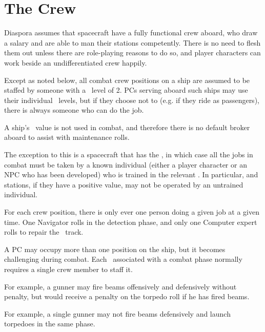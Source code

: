 \section{The Crew}
\label{sec:the-crew}

Diaspora assumes that spacecraft have a fully functional crew aboard, who draw a salary and are able to man their stations competently.  There is no need to flesh them out unless there are role-playing reasons to do so, and player characters can work beside an undifferentiated crew happily.

Except as noted below, all combat crew positions on a ship are assumed to be staffed by someone with a \Skill\ level of 2.  PCs serving aboard such ships may use their individual \Skill\ levels, but if they choose not to (e.g. if they ride as passengers), there is always someone who can do the job.

A ship's \Trade\ value is not used in combat, and therefore there is no default broker aboard to assist with maintenance rolls.

The exception to this is a spacecraft that has the  \Stunt, in which case all the jobs in combat must be taken by a known individual (either a player character or an NPC who has been developed) who is trained in the relevant \Skill. In particular,  and  stations, if they have a positive value, may not be operated by an untrained individual.

For each crew position, there is only ever one person doing a given job at a given time. One Navigator rolls in the detection phase, and only one Computer expert rolls to repair the \Data\ track.

A PC may occupy more than one position on the ship, but it becomes challenging during combat. Each \Skill\ associated with a combat phase normally requires a single crew member to staff it.

For example, a gunner may fire beams offensively and defensively without penalty, but would receive a penalty on the torpedo roll if he has fired beams.

For example, a single gunner may not fire beams defensively and launch torpedoes in the same phase.

